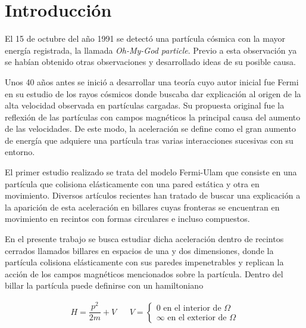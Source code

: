 %
%
%
\chapter{Introducción}

El 15 de octubre del año 1991 se detectó una partícula cósmica con la mayor energía registrada, la llamada \textit{Oh-My-God particle}\cite{OhMyParticle}. Previo a esta observación ya se habían obtenido otras observaciones y desarrollado ideas de su posible causa.

\vspace{3mm}

Unos 40 años antes se inició a desarrollar una teoría cuyo autor inicial fue Fermi \cite{Fermi} en su estudio de los rayos cósmicos donde buscaba dar explicación al origen de la alta velocidad observada en partículas cargadas. Su propuesta original fue la reflexión de las partículas con campos magnéticos la principal causa del aumento de las velocidades. De este modo, la aceleración se define como el gran aumento de energía que adquiere una partícula tras varias interacciones sucesivas con su entorno. 

\vspace{3mm}

El primer estudio realizado se trata del modelo Fermi-Ulam \cite{FermiUlam} que consiste en una partícula que colisiona elásticamente con una pared estática y otra en movimiento. Diversos artículos recientes han tratado de buscar una explicación a la aparición de esta aceleración en billares cuyas fronteras se encuentran en movimiento \cite{EnergyDifussion,SuppressingFermi, SuppressingFermi2, ReferenciaProfe, NonAutonomous, ExponentialEnergy, GeneralBilliard, GeneralBilliard2} en recintos con formas circulares e incluso compuestos. 

\vspace{3mm}

En el presente trabajo se busca estudiar dicha aceleración dentro de recintos cerrados llamados billares en espacios de una y dos dimensiones, donde la partícula colisiona elásticamente con sus paredes impenetrables y replican la acción de los campos magnéticos mencionados sobre la partícula. Dentro del billar la partícula puede definirse con un hamiltoniano

\begin{align}
    H = \dfrac{p^2}{2m} + V & & V = \begin{cases}
        0 \text{ en el interior de } \Omega \\
        \infty \text{ en el exterior de } \Omega
    \end{cases}
\end{align}


